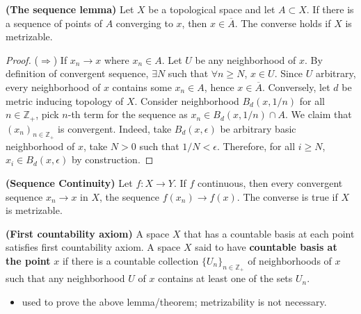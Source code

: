 \documentclass[10.5pt]{article}
\newcommand{\Z}{\mathbb{Z}}
\begin{document}
\begin{lemma*}
    \textbf{(The sequence lemma)} Let $X$ be a topological space and let $A\subset X$. If there is a sequence of points of $A$ converging to $x$, then $x\in \overline{A}$. The converse holds if $X$ is metrizable.
    \begin{proof}
        ($\Rightarrow$) If $x_n \to x$ where $x_n\in A$. Let $U$ be any neighborhood of $x$. By definition of convergent sequence, $\exists N$ such that $\forall n\geq N$, $x\in U$. Since $U$ arbitrary, every neighborhood of $x$ contains some $x_n \in A$, hence $x\in \overline{A}$. Conversely, let $d$ be metric inducing topology of $X$. Consider neighborhood $B_d(x,1/n)$ for all $n\in \Z_+$, pick $n$-th term for the sequence as $x_n \in B_d(x,1/n) \cap A$. We claim that $(x_n)_{n\in \Z_+}$ is convergent. Indeed, take $B_d(x,\epsilon)$ be arbitrary basic neighborhood of $x$, take $N>0$ such that $1/N < \epsilon$. Therefore, for all $i\geq N$, $x_i \in B_d(x,\epsilon)$ by construction.
    \end{proof}
\end{lemma*}

\begin{theorem*}
    \textbf{(Sequence Continuity)} Let $f:X\to Y$. If $f$ continuous, then every convergent sequence $x_n \to x$ in $X$, the sequence $f(x_n) \to f(x)$. The converse is true if $X$ is metrizable.
\end{theorem*}

\begin{defn*}
    \textbf{(First countability axiom)} A space $X$ that has a countable basis at each point satisfies first countability axiom. A space $X$ said to have \textbf{countable basis at the point} $x$ if there is a countable collection $\{U_n\}_{n\in \Z_+}$ of neighborhoods of $x$ such that any neighborhood $U$ of $x$ contains at least one of the sets $U_n$.
    \begin{itemize}
        \item used to prove the above lemma/theorem; metrizability is not necessary.
    \end{itemize}
\end{defn*}
\end{document}
